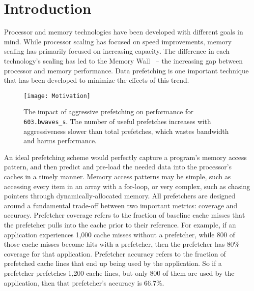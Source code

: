 \section{Introduction}
\label{Introduction}

Processor and memory technologies have been developed with different
goals in mind. While processor scaling has focused on speed
improvements, memory scaling has primarily focused on increasing
capacity. The difference in each technology's scaling has led to the
Memory Wall~\cite{MemWall} -- the increasing gap between processor and
memory performance. Data prefetching is one important technique that
has been developed to minimize the effects of this trend.


\begin{figure}[t]
\texttt{[image: Motivation]}
\caption{The impact of aggressive prefetching on performance for {\tt 603.bwaves\_s}. 
The number of useful prefetches increases with aggressiveness
slower than total prefetches, which wastes bandwidth and 
harms performance.}
\label{Fig:Motivation}
\end{figure}

An ideal prefetching scheme would perfectly capture a program's memory
access pattern, and then predict and pre-load the needed data into the
processor's caches in a timely manner.  Memory access patterns may be
simple, such as accessing every item in an array with a for-loop, or
very complex, such as chasing pointers through dynamically-allocated
memory.  %
All prefetchers are designed around a fundamental trade-off between
two important metrics: coverage and accuracy. Prefetcher coverage
refers to the fraction of baseline cache misses that the prefetcher
pulls into the cache prior to their reference.  For example, if an
application experiences 1,000 cache misses without a prefetcher, while
800 of those cache misses become hits with a prefetcher, then the
prefetcher has 80\% coverage for that application.  Prefetcher
accuracy refers to the fraction of prefetched cache lines that end up
being used by the application. So if a prefetcher prefetches 1,200
cache lines, but only 800 of them are used by the application, then
that prefetcher's accuracy is 66.7\%.

